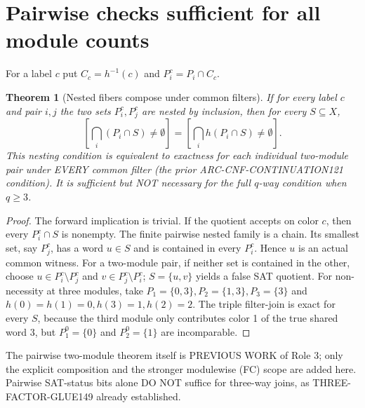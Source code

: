 \documentclass[11pt]{article}
\newtheorem{theorem}{Theorem}
\begin{document}
\section{Pairwise checks sufficient for all module counts}
For a label $c$ put $C_c=h^{-1}(c)$ and $P_i^c=P_i\cap C_c$.
\begin{theorem}[Nested fibers compose under common filters]
If for every label $c$ and pair $i,j$ the two sets $P_i^c,P_j^c$
are nested by inclusion, then for every $S\subseteq X$,
\[
 [\bigcap_i(P_i\cap S)\ne\emptyset]
 =
 [\bigcap_i h(P_i\cap S)\ne\emptyset].
\]
This nesting condition is equivalent to exactness for each individual
two-module pair under EVERY common filter (the prior
ARC-CNF-CONTINUATION121 condition). It is sufficient but NOT necessary
for the full $q$-way condition when $q\ge3$.
\end{theorem}
\begin{proof}
The forward implication is trivial. If the quotient accepts on
color $c$, then every $P_i^c\cap S$ is nonempty. The finite
pairwise nested family is a chain. Its smallest set, say $P_j^c$,
has a word $u\in S$ and is contained in every $P_i^c$.
Hence $u$ is an actual common witness.
For a two-module pair, if neither set is contained in the other,
choose $u\in P_i^c\setminus P_j^c$ and
$v\in P_j^c\setminus P_i^c$; $S=\{u,v\}$ yields a false SAT quotient.
For non-necessity at three modules, take
$P_1=\{0,3\},P_2=\{1,3\},P_3=\{3\}$ and
$h(0)=h(1)=0,h(3)=1,h(2)=2$.
The triple filter-join is exact for every $S$, because the third
module only contributes color 1 of the true shared word 3, but
$P_1^0=\{0\}$ and $P_2^0=\{1\}$ are incomparable.
\end{proof}
The pairwise two-module theorem itself is PREVIOUS WORK of Role 3;
only the explicit composition and the stronger modulewise (FC)
scope are added here. Pairwise SAT-status bits alone DO NOT suffice
for three-way joins, as THREE-FACTOR-GLUE149 already established.
\end{document}
